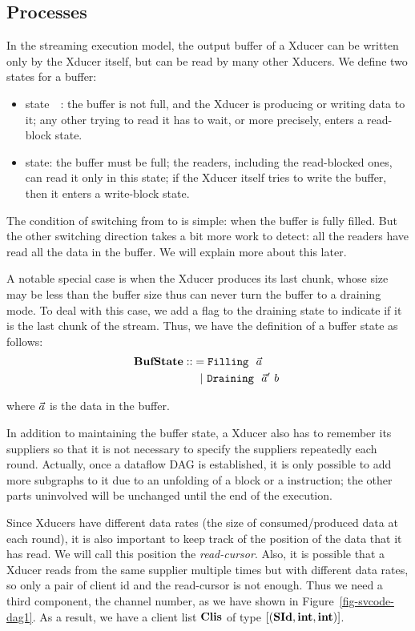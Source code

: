 \subsection{Processes}
In the streaming execution model, the output buffer of a Xducer can be written only by the Xducer itself, but can be read by many other Xducers. 
We define two states for a buffer:
\begin{itemize}
	\item \filling state　: the buffer is not full, and the Xducer is producing or writing data to it; any other trying to read it has to wait, or more precisely, enters a read-block state.

	\item \draining state: the buffer must be full; the readers, including the read-blocked ones, can read it only in this state; if the Xducer itself tries to write the buffer, then it enters a write-block state.
\end{itemize}

The condition of switching from \filling to \draining is simple: when the buffer is fully filled. 
But the other switching direction takes a bit more work to detect: all the readers have read all the data in the buffer. We will explain more about this later.


A notable special case is when the Xducer produces its last chunk, whose size may be less than the buffer size thus can never turn the buffer to a draining mode.
To deal with this case, we add a flag to the draining state to indicate if it is the last chunk of the stream. 
Thus, we have the definition of a buffer state as follows:
\begin{align*}
	\mathbf{BufState} :: & = \texttt{Filling} \  \ \vec a \\
	          & \ \ | \ \texttt{Draining} \  \ \vec a' \ b \
\end{align*}

where $\vec a$ is the data in the buffer.

In addition to maintaining the buffer state, a Xducer also has to remember its suppliers so that it is not necessary to specify the suppliers repeatedly each round. 
Actually, once a dataflow DAG is established, it is only possible to add more subgraphs to it due to an unfolding of a \wc block or a \sc instruction; the other parts uninvolved will be unchanged until the end of the execution.


Since Xducers have different data rates (the size of consumed/produced data at each round), it is also important to keep track of the position of the data that it has read.
We will call this position the \emph{read-cursor}.
Also, it is possible that a Xducer reads from the same supplier multiple times but with different data rates, so only a pair of client id and the read-cursor is not enough.
Thus we need a third component, the channel number, as we have shown in Figure~\ref{fig-svcode-dag1}.
As a result, we have a client list $\mathbf{Clis}$ of type $[(\mathbf{SId}, \mathbf{int}, \mathbf{int})]$.

